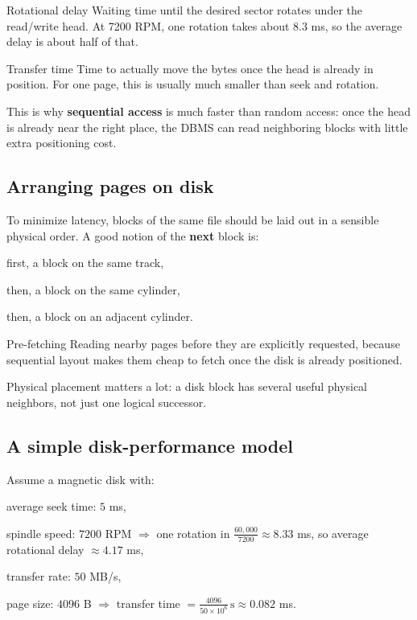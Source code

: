 \documentclass[../../dis.tex]{subfiles}
\begin{document}
\begin{concept}{Rotational delay}
Waiting time until the desired sector rotates under the read/write head. At 7200 RPM, one rotation takes about \(8.3\) ms, so the average delay is about half of that.
\end{concept}

\begin{concept}{Transfer time}
Time to actually move the bytes once the head is already in position. For one page, this is usually much smaller than seek and rotation.
\end{concept}

This is why \textbf{sequential access} is much faster than random access: once the head is already near the right place, the DBMS can read neighboring blocks with little extra positioning cost.

\subsection{Arranging pages on disk}
To minimize latency, blocks of the same file should be laid out in a sensible physical order. A good notion of the \textbf{next} block is:

\begin{dashlist}
    \item first, a block on the same track,
    \item then, a block on the same cylinder,
    \item then, a block on an adjacent cylinder.
\end{dashlist}

\begin{concept}{Pre-fetching}
Reading nearby pages before they are explicitly requested, because sequential layout makes them cheap to fetch once the disk is already positioned.
\end{concept}

Physical placement matters a lot: a disk block has several useful physical neighbors, not just one logical successor.

\subsection{A simple disk-performance model}
Assume a magnetic disk with:
\begin{dashlist}
    \item average seek time: \(5\) ms,
    \item spindle speed: \(7200\) RPM \(\Rightarrow\) one rotation in \(\frac{60{,}000}{7200} \approx 8.33\) ms, so average rotational delay \(\approx 4.17\) ms,
    \item transfer rate: \(50\) MB/s,
    \item page size: \(4096\) B \(\Rightarrow\) transfer time \(= \frac{4096}{50 \times 10^6}\,\text{s} \approx 0.082\) ms.
\end{dashlist}
\end{document}
